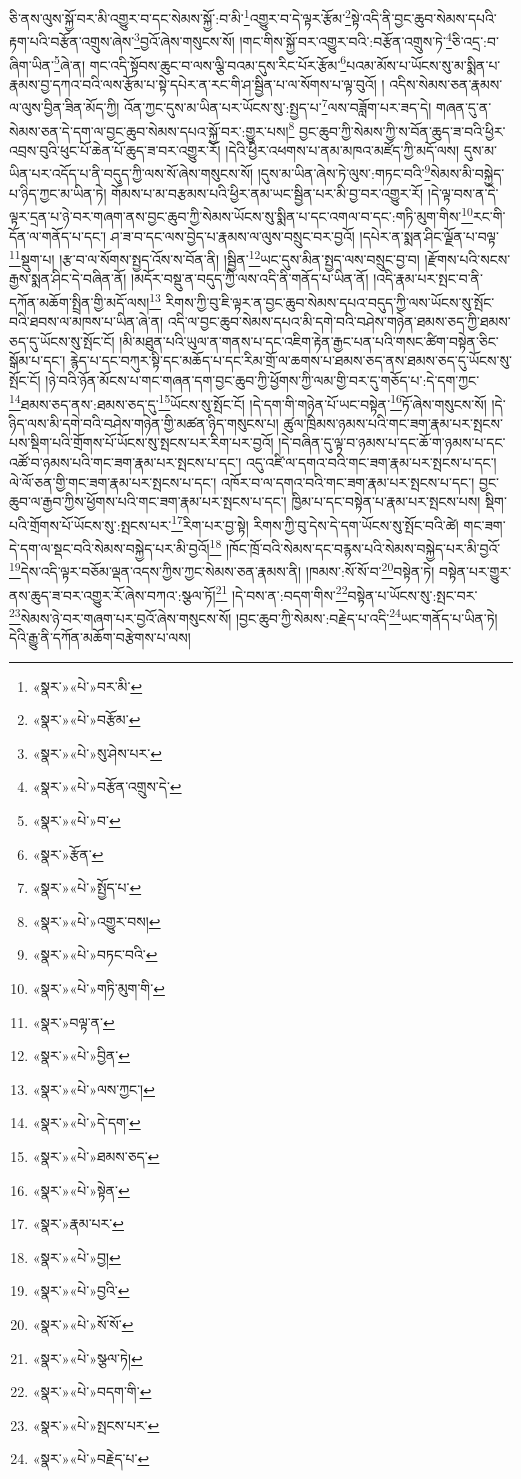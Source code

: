 ཅི་ནས་ལུས་སྐྱོ་བར་མི་འགྱུར་བ་དང་སེམས་སྐྱོ་:བ་མི་\footnote{«སྣར་»«པེ་»བར་མི་}འགྱུར་བ་དེ་ལྟར་རྩོམ་\footnote{«སྣར་»«པེ་»བརྩོམ་}སྟེ་འདི་ནི་བྱང་ཆུབ་སེམས་དཔའི་རྟག་པའི་བརྩོན་འགྲུས་ཞེས་\footnote{«སྣར་»«པེ་»སུ་ཤེས་པར་}བྱའོ་ཞེས་གསུངས་སོ། །གང་གིས་སྐྱོ་བར་འགྱུར་བའི་:བརྩོན་འགྲུས་ཏེ་\footnote{«སྣར་»«པེ་»བརྩོན་འགྲུས་དེ་}ཅི་འདྲ་:བ་ཞིག་ཡིན་\footnote{«སྣར་»«པེ་»བ་}ཞེ་ན། གང་འདི་སྟོབས་ཆུང་བ་ལས་ལྕི་བའམ་དུས་རིང་པོར་རྩོམ་\footnote{«སྣར་»རྩོན་}པའམ་མོས་པ་ཡོངས་སུ་མ་སྨིན་པ་རྣམས་བྱ་དཀའ་བའི་ལས་རྩོམ་པ་སྟེ་དཔེར་ན་རང་གི་ཤ་སྦྱིན་པ་ལ་སོགས་པ་ལྟ་བུའོ། །
འདིས་སེམས་ཅན་རྣམས་ལ་ལུས་བྱིན་ཟིན་མོད་ཀྱི། འོན་ཀྱང་དུས་མ་ཡིན་པར་ཡོངས་སུ་:སྤྱད་པ་\footnote{«སྣར་»«པེ་»སྤྱོད་པ་}ལས་བཟློག་པར་ཟད་དེ། གཞན་དུ་ན་སེམས་ཅན་དེ་དག་ལ་བྱང་ཆུབ་སེམས་དཔའ་སྐྱོ་བར་:གྱུར་པས།\footnote{«སྣར་»«པེ་»འགྱུར་བས།} བྱང་ཆུབ་ཀྱི་སེམས་ཀྱི་ས་བོན་ཆུད་ཟ་བའི་ཕྱིར་འབྲས་བུའི་ཕུང་པོ་ཆེན་པོ་ཆུད་ཟ་བར་འགྱུར་རོ། །དེའི་ཕྱིར་འཕགས་པ་ནམ་མཁའ་མཛོད་ཀྱི་མདོ་ལས། དུས་མ་ཡིན་པར་འདོད་པ་ནི་བདུད་ཀྱི་ལས་སོ་ཞེས་གསུངས་སོ། །དུས་མ་ཡིན་ཞེས་ཏེ་ལུས་:གཏང་བའི་\footnote{«སྣར་»«པེ་»བཏང་བའི་}སེམས་མི་བསྐྱེད་པ་ཉིད་ཀྱང་མ་ཡིན་ཏེ། གོམས་པ་མ་བརྩམས་པའི་ཕྱིར་ནམ་ཡང་སྦྱིན་པར་མི་བྱ་བར་འགྱུར་རོ། །དེ་ལྟ་བས་ན་དེ་ལྟར་དྲན་པ་ཉེ་བར་གཞག་ནས་བྱང་ཆུབ་ཀྱི་སེམས་ཡོངས་སུ་སྨིན་པ་དང་འགལ་བ་དང་:གཏི་མུག་གིས་\footnote{«སྣར་»«པེ་»གཏི་མུག་གི་}རང་གི་དོན་ལ་གནོད་པ་དང་། ཤ་ཟ་བ་དང་ལས་བྱེད་པ་རྣམས་ལ་ལུས་བསྲུང་བར་བྱའོ། །དཔེར་ན་སྨན་ཤིང་ལྗོན་པ་བལྟ་\footnote{«སྣར་»བལྟ་ན་}སྡུག་པ། །རྩ་བ་ལ་སོགས་སྤྱད་འོས་ས་བོན་ནི། །སྦྱིན་\footnote{«སྣར་»«པེ་»བྱིན་}ཡང་དུས་མིན་སྤྱད་ལས་བསྲུང་བྱ་བ། །རྫོགས་པའི་སངས་རྒྱས་སྨན་ཤིང་དེ་བཞིན་ནོ། །མདོར་བསྡུ་ན་བདུད་ཀྱི་ལས་འདི་ནི་གནོད་པ་ཡིན་ནོ། །འདི་རྣམ་པར་སྤང་བ་ནི་དཀོན་མཆོག་སྤྲིན་གྱི་མདོ་ལས།\footnote{«སྣར་»«པེ་»ལས་ཀྱང་།} རིགས་ཀྱི་བུ་ཇི་ལྟར་ན་བྱང་ཆུབ་སེམས་དཔའ་བདུད་ཀྱི་ལས་ཡོངས་སུ་སྤོང་བའི་ཐབས་ལ་མཁས་པ་ཡིན་ཞེ་ན། འདི་ལ་བྱང་ཆུབ་སེམས་དཔའ་མི་དགེ་བའི་བཤེས་གཉེན་ཐམས་ཅད་ཀྱི་ཐམས་ཅད་དུ་ཡོངས་སུ་སྤོང་ངོ། །མི་མཐུན་པའི་ཡུལ་ན་གནས་པ་དང་འཇིག་རྟེན་རྒྱང་པན་པའི་གསང་ཚིག་བསྟེན་ཅིང་སྒོམ་པ་དང་། རྙེད་པ་དང་བཀུར་སྟི་དང་མཆོད་པ་དང་རིམ་གྲོ་ལ་ཆགས་པ་ཐམས་ཅད་ནས་ཐམས་ཅད་དུ་ཡོངས་སུ་སྤོང་ངོ། །ཉེ་བའི་ཉོན་མོངས་པ་གང་གཞན་དག་བྱང་ཆུབ་ཀྱི་ཕྱོགས་ཀྱི་ལམ་གྱི་བར་དུ་གཅོད་པ་:དེ་དག་ཀྱང་\footnote{«སྣར་»«པེ་»དེ་དག་}ཐམས་ཅད་ནས་:ཐམས་ཅད་དུ་\footnote{«སྣར་»«པེ་»ཐམས་ཅད་}ཡོངས་སུ་སྤོང་ངོ། །དེ་དག་གི་གཉེན་པོ་ཡང་བསྟེན་\footnote{«སྣར་»«པེ་»སྟེན་}ཏོ་ཞེས་གསུངས་སོ། །དེ་ཉིད་ལས་མི་དགེ་བའི་བཤེས་གཉེན་གྱི་མཚན་ཉིད་གསུངས་པ། ཚུལ་ཁྲིམས་ཉམས་པའི་གང་ཟག་རྣམ་པར་སྤངས་པས་སྡིག་པའི་གྲོགས་པོ་ཡོངས་སུ་སྤངས་པར་རིག་པར་བྱའོ། །དེ་བཞིན་དུ་ལྟ་བ་ཉམས་པ་དང་ཆོ་ག་ཉམས་པ་དང་འཚོ་བ་ཉམས་པའི་གང་ཟག་རྣམ་པར་སྤངས་པ་དང་། འདུ་འཛི་ལ་དགའ་བའི་གང་ཟག་རྣམ་པར་སྤངས་པ་དང་། ལེ་ལོ་ཅན་གྱི་གང་ཟག་རྣམ་པར་སྤངས་པ་དང་། འཁོར་བ་ལ་དགའ་བའི་གང་ཟག་རྣམ་པར་སྤངས་པ་དང་། བྱང་ཆུབ་ལ་རྒྱབ་ཀྱིས་ཕྱོགས་པའི་གང་ཟག་རྣམ་པར་སྤངས་པ་དང་། ཁྱིམ་པ་དང་བསྟེན་པ་རྣམ་པར་སྤངས་པས། སྡིག་པའི་གྲོགས་པོ་ཡོངས་སུ་:སྤངས་པར་\footnote{«སྣར་»རྣམ་པར་}རིག་པར་བྱ་སྟེ། རིགས་ཀྱི་བུ་དེས་དེ་དག་ཡོངས་སུ་སྤོང་བའི་ཚེ། གང་ཟག་དེ་དག་ལ་སྡང་བའི་སེམས་བསྐྱེད་པར་མི་བྱའོ།\footnote{«སྣར་»«པེ་»བྱ།} །ཁོང་ཁྲོ་བའི་སེམས་དང་བརྙས་པའི་སེམས་བསྐྱེད་པར་མི་བྱའོ་\footnote{«སྣར་»«པེ་»བྱའི་}དེས་འདི་ལྟར་བཅོམ་ལྡན་འདས་ཀྱིས་ཀྱང་སེམས་ཅན་རྣམས་ནི། །ཁམས་:སོ་སོ་བ་\footnote{«སྣར་»«པེ་»སོ་སོ་}བསྟེན་ཏེ། བསྟེན་པར་གྱུར་ནས་ཆུད་ཟ་བར་འགྱུར་རོ་ཞེས་བཀའ་:སྩལ་ཏོ།\footnote{«སྣར་»«པེ་»སྩལ་ཏེ།} །དེ་བས་ན་:བདག་གིས་\footnote{«སྣར་»«པེ་»བདག་གི་}བསྟེན་པ་ཡོངས་སུ་:སྤང་བར་\footnote{«སྣར་»«པེ་»སྤངས་པར་}སེམས་ཉེ་བར་གཞག་པར་བྱའོ་ཞེས་གསུངས་སོ། །བྱང་ཆུབ་ཀྱི་སེམས་:བརྗེད་པ་འདི་\footnote{«སྣར་»«པེ་»བརྗེད་པ་}ཡང་གནོད་པ་ཡིན་ཏེ། དེའི་རྒྱུ་ནི་དཀོན་མཆོག་བརྩེགས་པ་ལས། 